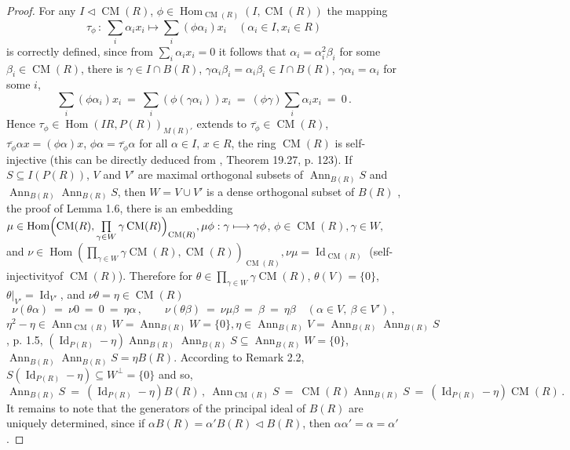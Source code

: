 \documentclass[a4paper,11pt]{article}
\DeclareMathOperator{\Id}{Id}
\DeclareMathOperator{\Hom}{Hom}
\DeclareMathOperator{\CM}{CM}
\DeclareMathOperator{\Ann}{Ann}
\begin{document}
\begin{proof}
For any ${I\lhd \CM(R)}$, ${\phi\in \Hom_{\CM(R)}(I, \CM(R))}$ the mapping 
\[
\tau_{\phi}\,:\ \sum_i \alpha_i x_i\longmapsto \sum_i (\phi \alpha_i) x_i
\quad (\alpha_i\in I, x_i\in R)
\]
is correctly defined, since from ${\sum\limits_i \alpha_i x_i=0}$ it follows 
that ${\alpha_i=\alpha_i^2 \beta_i}$ for some ${\beta_i\in \CM(R)}$, there is 
${\gamma\in I\cap B(R)}$, ${\gamma \alpha_i \beta_i=\alpha_i \beta_i\in I\cap B(R)}$, 
${\gamma \alpha_i=\alpha_i}$ for some $i$, 
\[
\sum_i (\phi \alpha_i) x_i\ =\ \sum_i (\phi (\gamma \alpha_i)) x_i\ =\ 
(\phi \gamma) \sum_i \alpha_i x_i\ =\ 0\,.
\]
Hence ${\tau_{\phi}\in \Hom(I R, P(R))_{M(R)'}}$ extends to 
${\overline{\tau_{\phi}}\in \CM(R)}$, 
${\overline{\tau_{\phi}} \alpha x=(\phi \alpha) x}$, 
${\phi \alpha=\overline{\tau_{\phi}} \alpha}$ for all ${\alpha\in I}$, 
${x\in R}$, the ring $\CM(R)$ is self-injective (this can be directly 
deduced from \cite{Fe}, Theorem 19.27, p. 123). 
If ${S\subseteq I(P(R))}$, $V$ and $V'$ are maximal orthogonal subsets of 
${\Ann_{B(R)} S}$ and ${\Ann_{B(R)} \Ann_{B(R)} S}$, then ${W=V\cup V'}$ 
is a dense orthogonal subset of $B(R)$  
\cite{BMich}, the proof of Lemma 1.6, there is an embedding 
${\mu\in \Hom\Bigl(\CM(R), 
\prod\limits_{\gamma\in W} \gamma \CM(R)\Bigr)_{\CM(R)}, 
\mu \phi: \gamma\longmapsto \gamma \phi}$, 
${\phi\in \CM(R), \gamma\in W,}$ and 
${\nu\in \Hom(\prod\limits_{\gamma\in W} \gamma \CM(R), \CM(R))_{\CM(R)}, 
\nu \mu=\Id_{\CM(R)}}$ (self-injectivity\linebreak of $\CM(R)$). Therefore for 
${\theta\in \prod\limits_{\gamma\in W} \gamma \CM(R)}$, 
${\theta(V)=\{0\}}$, ${\theta|_{V'}=\Id_{V'}}$, and 
${\nu \theta=\eta\in \CM(R)}$
\[
\nu (\theta \alpha)\ =\ \nu 0\ =\ 0\ =\ \eta \alpha\,,\quad 
\quad \nu (\theta \beta)\ =\ \nu \mu \beta\ =\ \beta\ =\ \eta \beta\quad 
(\alpha\in V,\ \beta\in V')\,,
\]
${\eta^2-\eta\in \Ann_{\CM(R)} W=\Ann_{B(R)} W=\{0\}, 
\eta\in \Ann_{B(R)} V=\Ann_{B(R)} \Ann_{B(R)} S}$ \cite{BMich}, p. 1.5,
${(\Id_{P(R)}-\eta) \Ann_{B(R)} \Ann_{B(R)} S\subseteq \Ann_{B(R)} W=\{0\}}$, 
${\Ann_{B(R)} \Ann_{B(R)} S=\eta B(R)}$. According to Remark 2.2, 
${S (\Id_{P(R)}-\eta)\subseteq W^{\perp}=\{0\}}$ and so, 
\[
\Ann_{B(R)} S\ =\ (\Id_{P(R)}-\eta) B(R)\,,\ 
\Ann_{\CM(R)} S\ =\ \CM(R) \Ann_{B(R)} S\ =\ (\Id_{P(R)}-\eta) \CM(R)\,.
\]
It remains to note that the generators of the principal ideal of $B(R)$ are 
uniquely determined, since if ${\alpha B(R)=\alpha' B(R)\lhd B(R)}$, then 
${\alpha \alpha'=\alpha=\alpha'}$. 
\end{proof}
\end{document}
